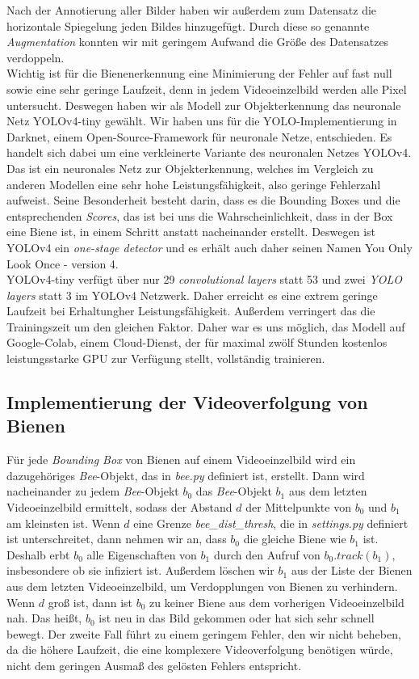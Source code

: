 \documentclass[11pt,a4paper]{article}
\begin{document}
Nach der Annotierung aller Bilder haben wir außerdem zum Datensatz die horizontale Spiegelung jeden Bildes hinzugefügt. Durch diese so genannte \textit{Augmentation} konnten wir mit geringem Aufwand die Größe des Datensatzes verdoppeln.\\
Wichtig ist für die Bienenerkennung eine Minimierung der Fehler auf fast null sowie eine sehr geringe Laufzeit, denn in jedem Videoeinzelbild werden alle Pixel untersucht. Deswegen haben wir als Modell zur Objekterkennung das neuronale Netz YOLOv4-tiny gewählt. Wir haben uns für die YOLO-Implementierung in Darknet, einem Open-Source-Framework für neuronale Netze, entschieden. Es handelt sich dabei um eine verkleinerte Variante des neuronalen Netzes YOLOv4. Das ist ein neuronales Netz zur Objekterkennung, welches im Vergleich zu anderen Modellen eine sehr hohe Leistungsfähigkeit, also geringe Fehlerzahl aufweist. Seine Besonderheit besteht darin, dass es die Bounding Boxes und die entsprechenden \textit{Scores}, das ist bei uns die Wahrscheinlichkeit, dass in der Box eine Biene ist, in einem Schritt anstatt nacheinander erstellt. Deswegen ist YOLOv4 ein \textit{one-stage detector} und es erhält auch daher seinen Namen \glqq You Only Look Once - version 4\grqq.\\
YOLOv4-tiny verfügt über nur 29 \textit{convolutional layers} statt 53 und zwei \textit{YOLO layers} statt 3 im YOLOv4 Netzwerk. Daher erreicht es eine extrem geringe Laufzeit bei Erhaltungher Leistungsfähigkeit. Außerdem verringert das die Trainingszeit um den gleichen Faktor. Daher war es uns möglich, das Modell auf Google-Colab, einem Cloud-Dienst, der für maximal zwölf Stunden kostenlos leistungsstarke GPU zur Verfügung stellt, vollständig trainieren.\\
\subsection{Implementierung der Videoverfolgung von Bienen}
Für jede \textit{Bounding Box} von Bienen auf einem Videoeinzelbild wird ein dazugehöriges \textit{Bee}-Objekt, das in \textit{bee.py} definiert ist, erstellt. Dann wird nacheinander zu jedem \textit{Bee}-Objekt $b_0$ das \textit{Bee}-Objekt $b_1$ aus dem letzten Videoeinzelbild ermittelt, sodass der Abstand $d$ der Mittelpunkte von $b_0$ und $b_1$ am kleinsten ist. Wenn $d$ eine Grenze \textit{bee\_dist\_thresh}, die in \textit{settings.py} definiert ist unterschreitet, dann nehmen wir an, dass $b_0$ die gleiche Biene wie $b_1$ ist. Deshalb erbt $b_0$ alle Eigenschaften von $b_1$ durch den Aufruf von $b_0.track(b_1)$, insbesondere ob sie infiziert ist. Außerdem löschen wir $b_1$ aus der Liste der Bienen aus dem letzten Videoeinzelbild, um Verdopplungen von Bienen zu verhindern. Wenn $d$ groß ist, dann ist $b_0$ zu keiner Biene aus dem vorherigen Videoeinzelbild nah. Das heißt, $b_0$ ist neu in das Bild gekommen oder hat sich sehr schnell bewegt. Der zweite Fall führt zu einem geringem Fehler, den wir nicht beheben, da die höhere Laufzeit, die eine komplexere Videoverfolgung benötigen würde, nicht dem geringen Ausmaß des gelösten Fehlers entspricht.
\end{document}
